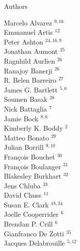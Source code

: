 \documentclass[PICOAPC.tex]{subfiles}
\begin{document}
\large  {\centerline {Authors}}
%
\footnotesize {
\begin{multicols}{4}
Marcelo Alvarez $^{9,16}$                 \\
Emmanuel Artis $^{12}$                  \\
Peter Ashton $^{24,16,9}$                    \\
Jonathan Aumont $^{25}$                 \\
Ragnhild Aurlien $^{26}$                \\
Ranajoy Banerji $^{26}$                 \\
R. Belen Barreiro $^{27}$               \\
James G. Bartlett $^{5,6}$               \\
Soumen Basak $^{28}$                    \\
Nick Battaglia $^{7}$                  \\
Jamie Bock $^{8,6}$                      \\
Kimberly K. Boddy $^{2}$               \\
Matteo Bonato $^{29}$                   \\
Julian Borrill $^{9,10}$                  \\
Fran\c{c}ois Bouchet $^{30}$            \\
Fran\c{c}ois Boulanger $^{31}$          \\
Blakesley Burkhart $^{32}$              \\
Jens Chluba $^{33}$                     \\
David Chuss $^{11}$                     \\
Susan E. Clark $^{18,34}$                  \\
Joelle Cooperrider $^{6}$              \\
Brendan P. Crill $^{6}$                \\
Gianfranco De Zotti $^{35}$             \\
Jacques Delabrouille $^{5,12}$            \\

\end{multicols}}
\end{document}
